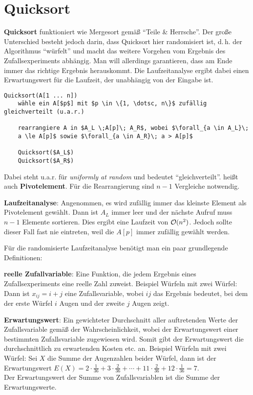 \section{%
    Quicksort%
}

\textbf{Quicksort} funktioniert wie Mergesort gemäß "`Teile \& Herrsche"'.
Der große Unterschied besteht jedoch darin, dass Quicksort hier randomisiert
ist, d.\,h. der Algorithmus "`würfelt"' und macht das weitere Vorgehen
vom Ergebnis des Zufallsexperiments abhängig.
Man will allerdings garantieren, dass am Ende immer das richtige Ergebnis
herauskommt.
Die Laufzeitanalyse ergibt dabei einen Erwartungswert für die Laufzeit,
der unabhängig von der Eingabe ist.

\begin{lstlisting}
Quicksort(A[1 ... n])
    wähle ein A[$p$] mit $p \in \{1, \dotsc, n\}$ zufällig gleichverteilt (u.a.r.)

    rearrangiere A in $A_L \;A[p]\; A_R$, wobei $\forall_{a \in A_L}\;
    a \le A[p]$ sowie $\forall_{a \in A_R}\; a > A[p]$

    Quicksort($A_L$)
    Quicksort($A_R$)
\end{lstlisting}

Dabei steht u.a.r. für \emph{uniformly at random} und bedeutet
"`gleichverteilt"'.
 heißt auch \textbf{Pivotelement}.
Für die Rearrangierung sind $n - 1$ Vergleiche notwendig.

\linie

\textbf{Laufzeitanalyse}:
Angenommen, es wird zufällig immer das kleinste Element als Pivotelement
gewählt.
Dann ist $A_L$ immer leer und der nächste Aufruf muss $n - 1$ Elemente
sortieren.
Dies ergibt eine Laufzeit von $\mathcal{O}(n^2)$.
Jedoch sollte dieser Fall fast nie eintreten, weil die $A[p]$ immer zufällig
gewählt werden.

Für die randomisierte Laufzeitanalyse benötigt man ein paar grundlegende
Definitionen:

\textbf{reelle Zufallvariable}: Eine Funktion, die jedem Ergebnis eines
Zufallsexperiments eine reelle Zahl zuweist.
Beispiel Würfeln mit zwei Würfel:
Dann ist $x_{ij} = i + j$ eine Zufallsvariable, wobei $ij$ das Ergebnis
bedeutet, bei dem der erste Würfel $i$ Augen und der zweite $j$ Augen zeigt.

\textbf{Erwartungswert}: Ein gewichteter Durchschnitt aller auftretenden
Werte der Zufallsvariable gemäß der Wahrscheinlichkeit, wobei der
Erwartungswert einer bestimmten Zufallsvariable zugewiesen wird.
Somit gibt der Erwartungswert die durchschnittlich zu erwartenden Kosten
etc. an.
Beispiel Würfeln mit zwei Würfel:
Sei $X$ die Summe der Augenzahlen beider Würfel, dann ist
der Erwartungswert $E(X) = 2 \cdot \frac{1}{36} + 3 \cdot \frac{2}{36} +
\dotsb + 11 \cdot \frac{2}{36} + 12 \cdot \frac{1}{36} = 7$. \\
Der Erwartungswert der Summe von Zufallsvariablen ist die Summe
der Erwartungswerte.

